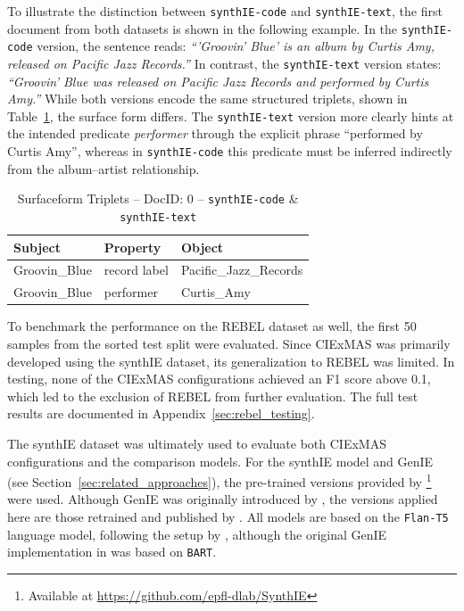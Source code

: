 \documentclass[a4paper,oneside,bibliography=totoc]{scrbook}
\begin{document}
To illustrate the distinction between \texttt{synthIE-code} and \texttt{synthIE-text}, the first document from both datasets is shown in the following example. In the \texttt{synthIE-code} version, the sentence reads: \emph{\enquote{'Groovin' Blue' is an album by Curtis Amy, released on Pacific Jazz Records.}} In contrast, the \texttt{synthIE-text} version states: \emph{\enquote{Groovin' Blue was released on Pacific Jazz Records and performed by Curtis Amy.}} While both versions encode the same structured triplets, shown in Table~\ref{tab:triple-example}, the surface form differs. The \texttt{synthIE-text} version more clearly hints at the intended predicate \emph{performer} through the explicit phrase \enquote{performed by Curtis Amy}, whereas in \texttt{synthIE-code} this predicate must be inferred indirectly from the album–artist relationship.

\begin{table}[h]
  \centering
  \begin{tabular}{l l l}
    \toprule
    \textbf{Subject} & \textbf{Property} & \textbf{Object}        \\
    \midrule
    Groovin\_Blue    & record label      & Pacific\_Jazz\_Records \\
    Groovin\_Blue    & performer         & Curtis\_Amy            \\
    \bottomrule
  \end{tabular}
  \caption{Surfaceform Triplets – DocID: 0 – \texttt{synthIE-code} \& \texttt{synthIE-text}}
  \label{tab:triple-example}
\end{table}

To benchmark the performance on the REBEL dataset as well, the first 50 samples from the sorted test split were evaluated. Since CIExMAS was primarily developed using the synthIE dataset, its generalization to REBEL was limited. In testing, none of the CIExMAS configurations achieved an F1 score above 0.1, which led to the exclusion of REBEL from further evaluation. The full test results are documented in Appendix~\ref{sec:rebel_testing}.

The synthIE dataset was ultimately used to evaluate both CIExMAS configurations and the comparison models. For the synthIE model and GenIE (see Section~\ref{sec:related_approaches}), the pre-trained versions provided by \citet{Josifoski2023}\footnote{Available at \url{https://github.com/epfl-dlab/SynthIE}} were used. Although GenIE was originally introduced by \citet{Josifoski2021}, the versions applied here are those retrained and published by \citet{Josifoski2023}. All models are based on the \texttt{Flan-T5} language model, following the setup by \citet{Josifoski2023}, although the original GenIE implementation in \citet{Josifoski2021} was based on \texttt{BART}.
\end{document}
